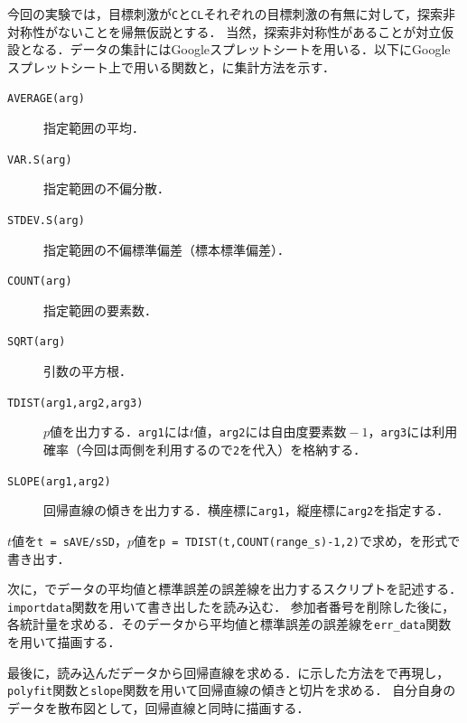 今回の実験では，目標刺激が\texttt{C}と\texttt{CL}それぞれの目標刺激の有無に対して，探索非対称性がないことを帰無仮説とする．
当然，探索非対称性があることが対立仮設となる．データの集計にはGoogleスプレットシートを用いる．以下にGoogleスプレットシート上で用いる関数と，に集計方法を示す．
\begin{multicols}{2}
    \begin{description}
        \item[\texttt{AVERAGE(arg)}] 指定範囲の平均．
        \item[\texttt{VAR.S(arg)}] 指定範囲の不偏分散．
        \item[\texttt{STDEV.S(arg)}] 指定範囲の不偏標準偏差（標本標準偏差）．
        \item[\texttt{COUNT(arg)}] 指定範囲の要素数．
        \item[\texttt{SQRT(arg)}] 引数の平方根．
        \item[\texttt{TDIST(arg1,arg2,arg3)}] \(p\)値を出力する．\texttt{arg1}には\(t\)値，\texttt{arg2}には自由度\(\textrm{要素数}-1\)，\texttt{arg3}には利用確率（今回は両側を利用するので\texttt{2}を代入）を格納する．
        \item[\texttt{SLOPE(arg1,arg2)}] 回帰直線の傾きを出力する．横座標に\texttt{arg1}，縦座標に\texttt{arg2}を指定する．
    \end{description}
\end{multicols}

\(t\)値を\texttt{t = sAVE/sSD}，\(p\)値を\texttt{p = TDIST(t,COUNT(range\_s)-1,2)}で求め，を\csv 形式で書き出す．\par
次に，\matlab でデータの平均値と標準誤差の誤差線を出力するスクリプトを記述する．\texttt{importdata}関数を用いて書き出した\csv を読み込む．
参加者番号を削除した後に，各統計量を求める．そのデータから平均値と標準誤差の誤差線を\texttt{err\_data}関数を用いて描画する．\par
最後に，読み込んだデータから回帰直線を求める．に示した方法を\matlab で再現し，\texttt{polyfit}関数と\texttt{slope}関数を用いて回帰直線の傾きと切片を求める．
自分自身のデータを散布図として，回帰直線と同時に描画する．
